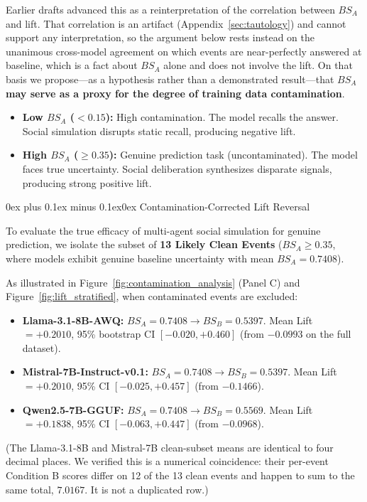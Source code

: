 \documentclass[11pt,journal,onecolumn]{IEEEtran}
\makeatletter
\renewcommand\subsubsection{\@startsection{subsubsection}{3}{\parindent}%
  {0ex plus 0.1ex minus 0.1ex}{0ex}%
  {\normalfont\normalsize\bfseries\itshape}}
\makeatother
\begin{document}
Earlier drafts advanced this as a reinterpretation of the correlation between $BS_A$ and lift. That correlation is an artifact (Appendix~\ref{sec:tautology}) and cannot support any interpretation, so the argument below rests instead on the unanimous cross-model agreement on which events are near-perfectly answered at baseline, which is a fact about $BS_A$ alone and does not involve the lift. On that basis we propose---as a hypothesis rather than a demonstrated result---that \textbf{$BS_A$ may serve as a proxy for the degree of training data contamination}.
\begin{itemize}
    \item \textbf{Low $BS_A$ ($< 0.15$):} High contamination. The model recalls the answer. Social simulation disrupts static recall, producing negative lift.
    \item \textbf{High $BS_A$ ($\ge 0.35$):} Genuine prediction task (uncontaminated). The model faces true uncertainty. Social deliberation synthesizes disparate signals, producing strong positive lift.
\end{itemize}

\subsubsection{Contamination-Corrected Lift Reversal}

To evaluate the true efficacy of multi-agent social simulation for genuine prediction, we isolate the subset of \textbf{13 Likely Clean Events} ($BS_A \ge 0.35$, where models exhibit genuine baseline uncertainty with mean $BS_A = 0.7408$).

As illustrated in Figure~\ref{fig:contamination_analysis} (Panel C) and Figure~\ref{fig:lift_stratified}, when contaminated events are excluded:
\begin{itemize}
    \item \textbf{Llama-3.1-8B-AWQ:} $BS_A = 0.7408 \to BS_B = 0.5397$. Mean Lift $= +0.2010$, 95\% bootstrap CI $[-0.020, +0.460]$ (from $-0.0993$ on the full dataset).
    \item \textbf{Mistral-7B-Instruct-v0.1:} $BS_A = 0.7408 \to BS_B = 0.5397$. Mean Lift $= +0.2010$, 95\% CI $[-0.025, +0.457]$ (from $-0.1466$).
    \item \textbf{Qwen2.5-7B-GGUF:} $BS_A = 0.7408 \to BS_B = 0.5569$. Mean Lift $= +0.1838$, 95\% CI $[-0.063, +0.447]$ (from $-0.0968$).
\end{itemize}
(The Llama-3.1-8B and Mistral-7B clean-subset means are identical to four decimal places. We verified this is a numerical coincidence: their per-event Condition B scores differ on 12 of the 13 clean events and happen to sum to the same total, $7.0167$. It is not a duplicated row.)
\end{document}
